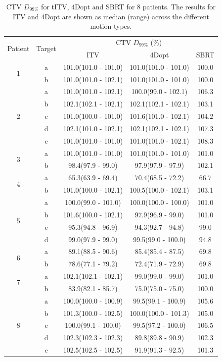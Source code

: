 
\begin{table}[H]
	\centering
	\caption{CTV $D_{99\%}$ for tITV, 4Dopt and SBRT for 8 patients. The results for ITV and 4Dopt are shown as median (range) across the different motion types.}
	\begin{tabular}{c|c|c|c|c}
		\hline\hline
		\multirow{2}{*}{Patient} & \multirow{2}{*}{Target} & \multicolumn{3}{|c}{CTV $D_{99\%}$ (\%)}  \\
		 &  & ITV & 4Dopt & SBRT \\
		 \hline
		 
\multirow{2}{*}{1} & a & 101.0(101.0 - 101.0) & 101.0(101.0 - 101.0) & 100.0\\ 
 & b & 101.0(101.0 - 102.1) & 101.0(101.0 - 101.0) & 100.0\\ 
 \hline
\multirow{5}{*}{2} & a & 101.0(101.0 - 102.1) & 100.0(99.0 - 102.1) & 106.3\\ 
 & b & 102.1(102.1 - 102.1) & 102.1(102.1 - 102.1) & 103.1\\ 
 & c & 101.0(100.0 - 101.0) & 101.6(101.0 - 102.1) & 104.2\\ 
 & d & 102.1(101.0 - 102.1) & 102.1(102.1 - 102.1) & 107.3\\ 
 & e & 101.0(101.0 - 101.0) & 101.0(101.0 - 102.1) & 108.3\\ 
 \hline
\multirow{2}{*}{3} & a & 101.0(101.0 - 101.0) & 101.0(101.0 - 101.0) & 101.0\\ 
 & b & 98.4(97.9 - 99.0) & 97.9(97.9 - 97.9) & 102.1\\ 
 \hline
\multirow{2}{*}{4} & a & 65.3(63.9 - 69.4) & 70.4(68.5 - 72.2) & 66.7\\ 
 & b & 101.0(100.0 - 102.1) & 100.5(100.0 - 102.1) & 103.1\\ 
 \hline
\multirow{4}{*}{5} & a & 100.0(99.0 - 101.0) & 100.0(100.0 - 100.0) & 101.0\\ 
 & b & 101.6(100.0 - 102.1) & 97.9(96.9 - 99.0) & 101.0\\ 
 & c & 95.3(94.8 - 96.9) & 94.3(92.7 - 94.8) & 99.0\\ 
 & d & 99.0(97.9 - 99.0) & 99.5(99.0 - 100.0) & 94.8\\ 
 \hline
\multirow{2}{*}{6} & a & 89.1(88.5 - 90.6) & 85.4(85.4 - 87.5) & 69.8\\ 
 & b & 78.6(77.1 - 79.2) & 72.4(71.9 - 72.9) & 69.8\\ 
 \hline
\multirow{2}{*}{7} & a & 102.1(102.1 - 102.1) & 99.0(99.0 - 99.0) & 101.0\\ 
 & b & 83.9(82.1 - 85.7) & 75.0(75.0 - 75.0) & 100.0\\ 
 \hline
\multirow{5}{*}{8} & a & 100.0(100.0 - 100.9) & 99.5(99.1 - 100.9) & 105.6\\ 
 & b & 101.3(100.0 - 102.5) & 100.0(100.0 - 101.3) & 105.0\\ 
 & c & 100.0(99.1 - 100.0) & 99.5(97.2 - 100.0) & 106.5\\ 
 & d & 102.3(102.3 - 102.3) & 89.8(89.8 - 90.9) & 102.3\\ 
 & e & 102.5(102.5 - 102.5) & 91.9(91.3 - 92.5) & 101.3\\ 
 \hline


\end{tabular}
\end{table}
